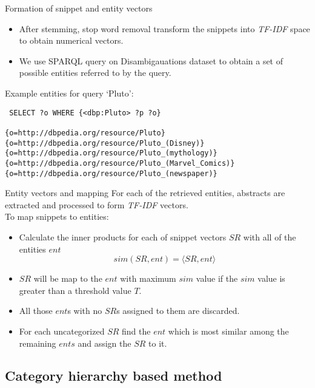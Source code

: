 \documentclass{beamer}
\begin{document}
\begin{frame}[fragile]{Formation of snippet and entity vectors}
\begin{itemize}
  \item After stemming, stop word removal transform the snippets into
    {\it TF-IDF} space to obtain numerical vectors.
  \item We use SPARQL query on Disambigauations dataset to obtain a
    set of possible entities referred to by the query. 
\end{itemize}
Example entities for query `Pluto':
\begin{verbatim}
 SELECT ?o WHERE {<dbp:Pluto> ?p ?o}

{o=http://dbpedia.org/resource/Pluto}
{o=http://dbpedia.org/resource/Pluto_(Disney)}
{o=http://dbpedia.org/resource/Pluto_(mythology)}
{o=http://dbpedia.org/resource/Pluto_(Marvel_Comics)}
{o=http://dbpedia.org/resource/Pluto_(newspaper)}
\end{verbatim}
\end{frame}

\begin{frame}{Entity vectors and mapping}
For each of the retrieved entities, abstracts are extracted and
processed to form {\it TF-IDF} vectors. \\
To map snippets to entities:
\begin{itemize}
   \item Calculate the inner products for each of snippet vectors $SR$
     with all of the entities $ent$
     $$ sim(SR, ent) =  \langle SR, ent \rangle $$
   \item $SR$ will be map to the $ent$ with maximum $sim$ value if
     the $sim$ value is greater than a threshold value $T$.
   \item All those $ent$s with no $SR$s assigned to them are
     discarded.
   \item For each uncategorized $SR$ find the $ent$ which is most
     similar among the remaining $ents$ and assign the $SR$ to it.
\end{itemize}
\end{frame}
 
\subsection{Category hierarchy based method}
\end{document}
